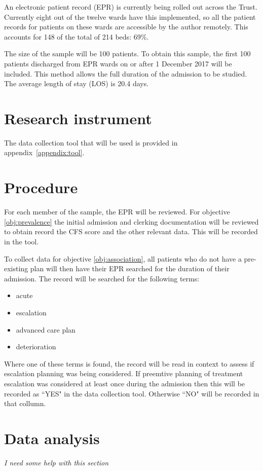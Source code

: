 \documentclass
[
	12pt,
	a4paper,
	oneside,
]{article}
\begin{document}
An electronic patient record (EPR) is currently being rolled out across the Trust.
Currently eight out of the twelve wards have this implemented, so all the patient 
records for patients on these wards are accessible by the author remotely. This
accounts for 148 of the total of 214 beds: 69\%. 

The size of the sample will be 100 patients. To obtain this sample, the first 100
patients discharged from EPR wards on or after 1 December 2017 will be included.
This method allows the full duration of the admission to be studied. The average
length of stay (LOS) is 20.4 days.

\section{Research instrument}

The data collection tool that will be used is 
provided in appendix~\ref{appendix:tool}.

\section{Procedure}
\label{sec:procedure}
For each member of the sample, the EPR will be reviewed. 
For objective \ref{obj:prevalence} 
the initial admission and clerking documentation will be reviewed to obtain
record the CFS score and the other relevant data. This will be recorded in the tool.


To collect data for objective \ref{obj:association}, all patients who do not have
a pre-existing plan will then have their EPR searched
for the duration of their admission. The record will be searched for the following
terms:

\begin{itemize}
\item acute
\item escalation
\item advanced care plan
\item deterioration
\end{itemize}

Where one of these terms is found, the record will be read in context to assess if 
escalation planning was being considered. If preemtive planning of treatment escalation
was considered at least once during the admission then this will be recorded as ``YES"
in the data collection tool. Otherwise ``NO" will be recorded in that collumn.

\section{Data analysis}
\emph{I need some help with this section}
\end{document}
